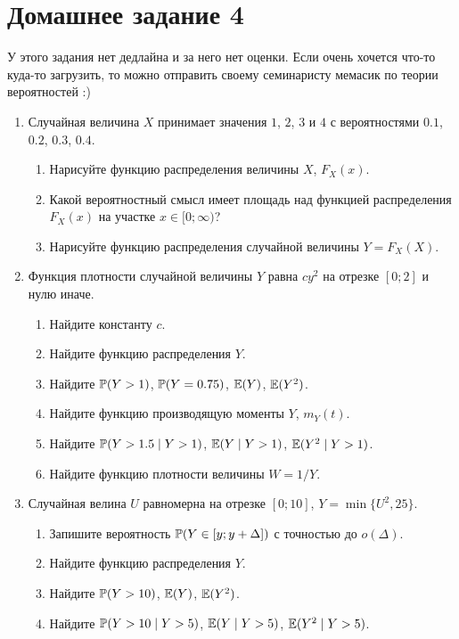 \section*{Домашнее задание 4}


У этого задания нет дедлайна и за него нет оценки. 
Если очень хочется что-то куда-то загрузить, то можно отправить своему семинаристу мемасик по теории вероятностей :)


\begin{enumerate}
\item Случайная величина $X$ принимает значения $1$, $2$, $3$ и $4$ с вероятностями $0.1$, $0.2$, $0.3$, $0.4$.
\begin{enumerate}
    \item Нарисуйте функцию распределения величины $X$, $F_X(x)$.
    \item Какой вероятностный смысл имеет площадь над функцией распределения $F_X(x)$ на участке $x \in [0;\infty)$?
    \item Нарисуйте функцию распределения случайной величины $Y = F_X(X)$.
\end{enumerate}

\item Функция плотности случайной величины $Y$ равна $c y^2$ на отрезке $[0;2]$ и нулю иначе. 
\begin{enumerate}
    \item Найдите константу $c$. 
    \item Найдите функцию распределения $Y$.
    \item Найдите $\P(Y > 1)$, $\P(Y = 0.75)$, $\E(Y)$, $\E(Y^2)$.
    \item Найдите функцию производящую моменты $Y$, $m_Y(t)$.
    \item Найдите $\P(Y > 1.5 \mid Y > 1)$, $\E(Y \mid Y>1)$, $\E(Y^2 \mid Y > 1)$.
    \item Найдите функцию плотности величины $W = 1 / Y$.
\end{enumerate}

\item Случайная велина $U$ равномерна на отрезке $[0;10]$, $Y = \min \{U^2, 25\}$.
\begin{enumerate}
    \item Запишите вероятность $\P(Y \in [y; y + \Delta])$ с точностью до $o(\Delta)$.
    \item Найдите функцию распределения $Y$.
    \item Найдите $\P(Y > 10)$, $\E(Y)$, $\E(Y^2)$.
    \item Найдите $\P(Y > 10 \mid Y > 5)$, $\E(Y \mid Y>5)$, $\E(Y^2 \mid Y > 5)$.
\end{enumerate}
\end{enumerate}
